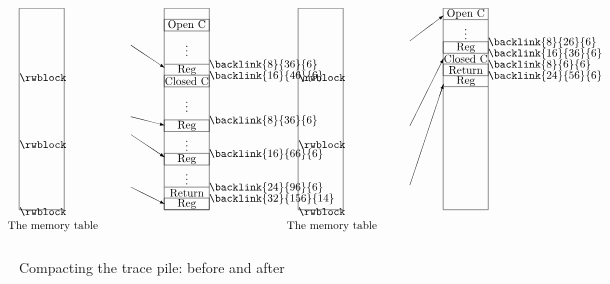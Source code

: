 \begin{figure*}
\small
\hrulefill
\[
\begin{picture}(250,210)(-30,0)
\put(-30,30){\framebox(40,180)[t]{\ }}
\put(-30,10){\makebox(60,10){The memory table}}
\put(-30,145){\rwblock}
\put(70,177){\vector(3,-2){30}}
\put(-30,85){\rwblock}
\put(70,113){\vector(4,-1){30}}
\put(70,97){\vector(3,-2){30}}
\put(-30,25){\rwblock}
\put(70,50){\vector(2,-1){30}}
\put(100,30){\framebox(40,180)[t]{\ }}
\put(100,190){\framebox(40,10){Open C}}
\put(100,170){\makebox(40,10){\vdots}}
\put(100,160){\line(1,0){40}}
\put(100,150){\makebox(40,10){Reg}}
\put(140,157){\backlink{8}{36}{6}}
\put(100,140){\framebox(40,10){Closed C}}
\put(140,147){\backlink{16}{46}{6}}
\put(100,120){\makebox(40,10){\vdots}}
\put(100,100){\framebox(40,10){Reg}}
\put(140,107){\backlink{8}{36}{6}}
\put(100,85){\makebox(40,10){\vdots}}
\put(100,70){\framebox(40,10){Reg}}
\put(140,77){\backlink{16}{66}{6}}
\put(100,50){\line(1,0){40}}
\put(100,55){\makebox(40,10){\vdots}}
\put(100,40){\makebox(40,10){Return}}
\put(140,47){\backlink{24}{96}{6}}
\put(100,30){\framebox(40,10){Reg}}
\put(140,37){\backlink{32}{156}{14}}
\end{picture}
%
%
\begin{picture}(200,210)(-30,0)
\put(-30,30){\framebox(40,180)[t]{\ }}
\put(-30,10){\makebox(60,10){The memory table}}
\put(-30,145){\rwblock}
\put(70,181){\vector(4,3){30}}
\put(-30,85){\rwblock}
\put(70,105){\vector(1,2){30}}
\put(-30,25){\rwblock}
\put(70,52){\vector(1,3){30}}
\put(100,30){\framebox(40,180)[t]{\ }}
\put(100,200){\makebox(40,10){Open C}}
\put(100,200){\line(1,0){40}}
\put(100,185){\makebox(40,10){\vdots}}
\put(100,170){\framebox(40,10){Reg}}
\put(140,177){\backlink{8}{26}{6}}
\put(100,160){\makebox(40,10){Closed C}}
\put(140,167){\backlink{16}{36}{6}}
\put(100,150){\framebox(40,10){Return}}
\put(140,157){\backlink{8}{6}{6}}
\put(100,140){\makebox(40,10){Reg}}
\put(140,147){\backlink{24}{56}{6}}
\put(100,140){\line(1,0){40}}
\end{picture}
\]
\hrulefill
\caption{Compacting the trace pile: before and after}
\label{fnyembladata}
\end{figure*}


